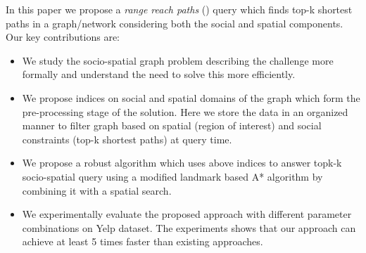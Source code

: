 In this paper we propose a \textit{range reach paths} ({\rrp}) query which finds top-k shortest paths in a graph/network considering both the social and spatial components. Our key contributions are:
\begin{itemize}
	\item We study the socio-spatial graph problem describing the challenge more formally and understand the need to solve this more efficiently.
	\item We propose indices on social and spatial domains of the graph which form the pre-processing stage of the solution. Here we store the data in an organized manner to filter graph based on spatial (region of interest) and social constraints (top-k shortest paths) at query time.
	\item We propose a robust algorithm which uses above indices to answer topk-k socio-spatial query using a modified landmark based A* algorithm by combining it with a spatial search.
	\item We experimentally evaluate the proposed approach with different parameter combinations on Yelp dataset. The experiments shows that our approach can achieve at least 5 times faster than existing approaches. %
\end{itemize}

